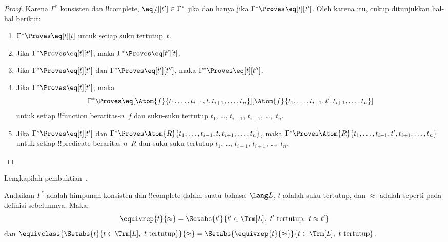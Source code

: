 \documentclass[../../../include/open-logic-section]{subfiles}
\begin{document}
\begin{proof}
Karena $\Gamma^*$ konsisten dan !!{complete}, $\eq[t][t'] \in
\Gamma^*$ jika dan hanya jika $\Gamma^* \Proves \eq[t][t']$. Oleh
karena itu, cukup ditunjukkan hal-hal berikut:
\begin{enumerate}
\item $\Gamma^* \Proves \eq[t][t]$ untuk setiap suku tertutup~$t$.
\item Jika $\Gamma^* \Proves \eq[t][t']$, maka $\Gamma^* \Proves \eq[t'][t]$.
\item Jika $\Gamma^* \Proves \eq[t][t']$ dan $\Gamma^* \Proves
  \eq[t'][t'']$, maka $\Gamma^* \Proves \eq[t][t'']$.
\item Jika $\Gamma^* \Proves \eq[t][t']$, maka
\[
\Gamma^* \Proves
\eq[\Atom{f}{t_1,\dots,t_{i-1},t,t_{i+1},\dots,t_n}][\Atom{f}{t_1,\dots,t_{i-1},t',t_{i+1},\dots,t_n}]
\]
untuk setiap !!{function} beraritas-$n$~$f$ dan suku-suku tertutup
$t_1$, \dots, $t_{i-1}$, $t_{i+1}$, \dots,~$t_n$.
\item Jika $\Gamma^* \Proves \eq[t][t']$ dan
$\Gamma^* \Proves
\Atom{R}{t_1,\dots,t_{i-1},t,t_{i+1},\dots,t_n}$, maka
$\Gamma^* \Proves \Atom{R}{t_1,\dots,t_{i-1},t',t_{i+1},\dots,t_n}$
untuk setiap !!{predicate} beraritas-$n$~$R$ dan suku-suku tertutup
$t_1$, \dots, $t_{i-1}$, $t_{i+1}$, \dots,~$t_n$.
\end{enumerate}
\end{proof}

\begin{prob}
Lengkapilah pembuktian~.
\end{prob}

\begin{defn}
Andaikan $\Gamma^*$ adalah himpunan konsisten dan !!{complete} dalam
suatu bahasa~$\Lang L$, $t$ adalah suku tertutup, dan $\approx$ adalah
seperti pada definisi sebelumnya. Maka:
\[
\equivrep{t}{\approx} = \Setabs{t'}{t'\in \Trm[L],\ t' \text{ tertutup},\ t \approx t'}
\]
dan
$\equivclass{\Setabs{t}{t \in \Trm[L],\ t \text{ tertutup}}}{\approx}
= \Setabs{\equivrep{t}{\approx}}{t \in \Trm[L],\ t \text{ tertutup}}$.
\end{defn}
\end{document}
